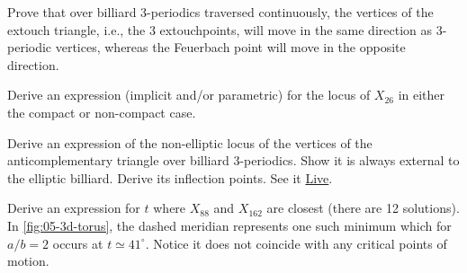 \begin{question}
Prove that over billiard 3-periodics traversed continuously, the vertices of the extouch triangle, i.e., the 3 extouchpoints, will move in the same direction as 3-periodic vertices, whereas the Feuerbach point will move in the opposite direction.  
\end{question}

\begin{question}
Derive an expression (implicit and/or parametric) for the locus of $X_{26}$ in either the compact or non-compact case.
\end{question}

\begin{question}
Derive an expression of the non-elliptic locus of the vertices of the anticomplementary triangle over billiard 3-periodics. Show it is always external to the elliptic billiard. Derive its inflection points. See it \href{https://bit.ly/2RtUT00}{Live}.
\end{question}

\begin{question}
\label{que:05-x88-x162}
Derive an expression for $t$ where $X_{88}$ and $X_{162}$ are closest (there are 12 solutions). In \cref{fig:05-3d-torus}, the dashed meridian represents one such minimum which for $a/b=2$ occurs at $t{\simeq}41^\circ$. Notice it does not coincide with any critical points of motion.
\end{question}